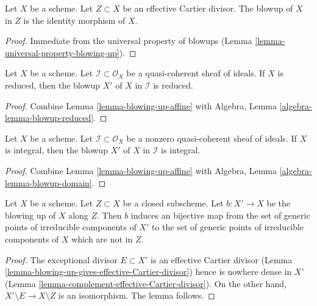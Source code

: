 \begin{lemma}
\label{lemma-blow-up-effective-Cartier-divisor}
Let $X$ be a scheme. Let $Z \subset X$ be an effective Cartier divisor.
The blowup of $X$ in $Z$ is the identity morphism of $X$.
\end{lemma}

\begin{proof}
Immediate from the universal property of blowups
(Lemma \ref{lemma-universal-property-blowing-up}).
\end{proof}

\begin{lemma}
\label{lemma-blow-up-reduced-scheme}
Let $X$ be a scheme. Let $\mathcal{I} \subset \mathcal{O}_X$ be a
quasi-coherent sheaf of ideals. If $X$ is reduced, then the
blowup $X'$ of $X$ in $\mathcal{I}$ is reduced.
\end{lemma}

\begin{proof}
Combine Lemma \ref{lemma-blowing-up-affine}
with Algebra, Lemma \ref{algebra-lemma-blowup-reduced}.
\end{proof}

\begin{lemma}
\label{lemma-blow-up-integral-scheme}
Let $X$ be a scheme. Let $\mathcal{I} \subset \mathcal{O}_X$ be a
nonzero quasi-coherent sheaf of ideals. If $X$ is integral, then the
blowup $X'$ of $X$ in $\mathcal{I}$ is integral.
\end{lemma}

\begin{proof}
Combine Lemma \ref{lemma-blowing-up-affine}
with Algebra, Lemma \ref{algebra-lemma-blowup-domain}.
\end{proof}

\begin{lemma}
\label{lemma-blow-up-and-irreducible-components}
Let $X$ be a scheme. Let $Z \subset X$ be a closed subscheme.
Let $b : X' \to X$ be the blowing up of $X$ along $Z$. Then
$b$ induces an bijective map from the set of generic points
of irreducible components of $X'$ to the set of generic points of
irreducible components of $X$ which are not in $Z$.
\end{lemma}

\begin{proof}
The exceptional divisor $E \subset X'$ is an effective Cartier divisor
(Lemma \ref{lemma-blowing-up-gives-effective-Cartier-divisor})
hence is nowhere dense in $X'$
(Lemma \ref{lemma-complement-effective-Cartier-divisor}).
On the other hand, $X' \setminus E \to X \setminus Z$ is an
isomorphism. The lemma follows.
\end{proof}

